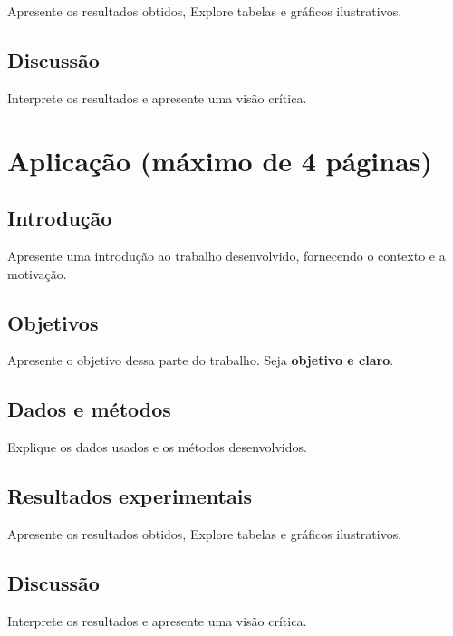 \documentclass{article}
\begin{document}
Apresente os resultados obtidos, Explore tabelas e gráficos ilustrativos.

\subsection{Discussão}

Interprete os resultados e apresente uma visão crítica.

\newpage

\section{Aplicação (máximo de 4 páginas)}

\subsection{Introdução}

Apresente uma introdução ao trabalho desenvolvido, fornecendo o contexto e a motivação.

\subsection{Objetivos}

Apresente o objetivo dessa parte do trabalho. Seja {\bf objetivo e claro}.

\subsection{Dados e métodos}

Explique os dados usados e os métodos desenvolvidos.

\subsection{Resultados experimentais}

Apresente os resultados obtidos, Explore tabelas e gráficos ilustrativos.

\subsection{Discussão}

Interprete os resultados e apresente uma visão crítica.
\end{document}
